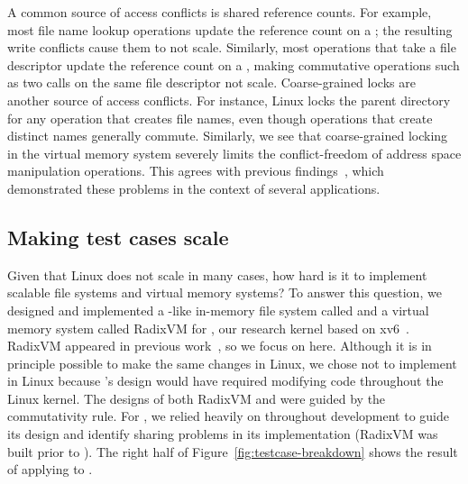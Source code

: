 A common source of access conflicts is shared reference counts.
%
For example, most file name lookup operations update the reference
count on a ; the resulting write conflicts cause
them to not scale.
%
Similarly, most operations that take a file descriptor update the
reference count on a , making
commutative operations such as two  calls on the
same file descriptor not scale.
Coarse-grained locks are another source of access conflicts.  For
instance, Linux locks the parent directory for any operation that
creates file names, even though operations that create distinct names
generally commute.
%
%
Similarly, we see that coarse-grained locking in the virtual memory
system severely limits the conflict-freedom of address space manipulation
operations. This agrees with previous
findings~\cite{boyd-wickizer:scaling,clements:radixvm,clements:bonsai},
which demonstrated these problems in the context of several applications.



\subsection{Making test cases scale}

Given that Linux does not scale in many cases, how hard is it
to implement scalable file systems and virtual memory systems?  To answer this
question, we designed and implemented a -like in-memory
file system called \fs and a virtual memory system called RadixVM for
\sys, our research kernel based on xv6~\cite{xv6}.  RadixVM appeared
in previous work~\cite{clements:radixvm}, so we focus on \fs here.
%
Although it is in principle possible to make the same changes in Linux,
we chose not to implement \fs in Linux because \fs's design
would have required modifying code throughout the Linux kernel.
%
The designs of both RadixVM and \fs were guided by the
commutativity rule.  For \fs, we relied heavily on \tool throughout
development to guide its design and identify sharing problems in its
implementation (RadixVM
was built prior to
\tool).
%
The right half of Figure~\ref{fig:testcase-breakdown} shows the
result of applying \tool
to \sys.

